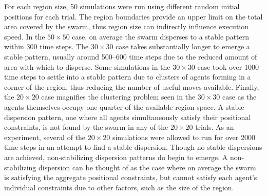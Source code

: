 For each region size, 50 simulations were run using different random initial positions for each trial.  The region boundaries provide an upper limit on the total area covered by the swarm, thus region size can indirectly influence execution speed.  In the $50\times50$ case, on average the swarm disperses to a stable pattern within 300 time steps.  The $30\times30$ case takes substantially longer to emerge a stable pattern, usually around 500--600 time steps due to the reduced amount of area with which to disperse.  Some simulations in the $30\times30$ case took over 1000 time steps to settle into a stable pattern due to clusters of agents forming in a corner of the region, thus reducing the number of useful moves available.  Finally, the $20\times20$ case magnifies the clustering problem seen in the $30\times30$ case as the agents themselves occupy one-quarter of the available region space.  A stable dispersion pattern, one where all agents simultaneously satisfy their positional constraints, is not found by the swarm in any of the $20\times20$ trials.  As an experiment, several of the $20\times20$ simulations were allowed to run for over 2000 time steps in an attempt to find a stable dispersion.  Though no stable dispersions are achieved, non-stabilizing dispersion patterns do begin to emerge.  A non-stabilizing dispersion can be thought of as the case where on average the swarm is satisfying the aggregate positional constraints, but cannot satisfy each agent's individual constraints due to other factors, such as the size of the region.


